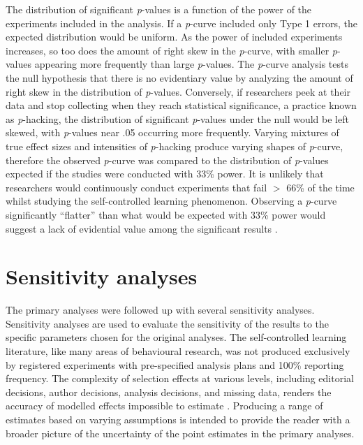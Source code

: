 \documentclass[man,floatsintext,hidelinks]{apa7}
\begin{document}
The distribution of significant \emph{p}-values is a function of the power of the experiments included in the analysis. If a \emph{p}-curve included only Type 1 errors, the expected distribution would be uniform. As the power of included experiments increases, so too does the amount of right skew in the \emph{p}-curve, with smaller \emph{p}-values appearing more frequently than large \emph{p}-values. The \emph{p}-curve analysis tests the null hypothesis that there is no evidentiary value by analyzing the amount of right skew in the distribution of \emph{p}-values. Conversely, if researchers peek at their data and stop collecting when they reach statistical significance, a practice known as \emph{p}-hacking, the distribution of significant \emph{p}-values under the null would be left skewed, with \emph{p}-values near .05 occurring more frequently. Varying mixtures of true effect sizes and intensities of \emph{p}-hacking produce varying shapes of \emph{p}-curve, therefore the observed \emph{p}-curve was compared to the distribution of \emph{p}-values expected if the studies were conducted with 33\% power. It is unlikely that researchers would continuously conduct experiments that fail $>$ 66\% of the time whilst studying the self-controlled learning phenomenon. Observing a \emph{p}-curve significantly ``flatter'' than what would be expected with 33\% power would suggest a lack of evidential value among the significant results \parencite{Simonsohn2014-xq,Simonsohn2014-yo}. 

\section{Sensitivity analyses}
The primary analyses were followed up with several sensitivity analyses. Sensitivity analyses are used to evaluate the sensitivity of the results to the specific parameters chosen for the original analyses. The self-controlled learning literature, like many areas of behavioural research, was not produced exclusively by registered experiments with pre-specified analysis plans and 100\% reporting frequency. The complexity of selection effects at various levels, including editorial decisions, author decisions, analysis decisions, and missing data, renders the accuracy of modelled effects impossible to estimate \parencite{Carter2019-vv}. Producing a range of estimates based on varying assumptions is intended to provide the reader with a broader picture of the uncertainty of the point estimates in the primary analyses. 
\end{document}
